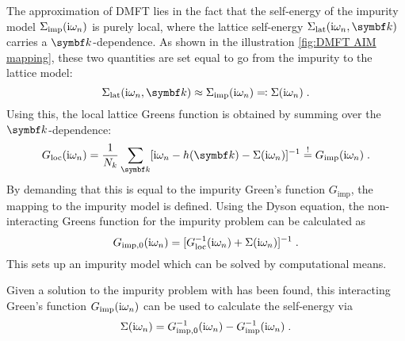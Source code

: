 \documentclass[../notes.tex]{subfiles}
\begin{document}
The approximation of DMFT lies in the fact that the self-energy of the impurity model \(\Sigma_{\mathrm{imp}} (\mathrm{i} \omega_n)\) is purely local, where the lattice self-energy \(\Sigma_{\mathrm{lat}} (\iu \omega_n, \vb{k})\) carries a \(\vb{k}\)-dependence.
As shown in the illustration \cref{fig:DMFT AIM mapping}, these two quantities are set equal to go from the impurity to the lattice model:
\begin{equation}
	\Sigma_{\mathrm{lat}} (\iu \omega_n, \vb{k}) \approx \Sigma_{\mathrm{imp}} (\iu \omega_n) \eqcolon \Sigma (\iu \omega_n) \;.
\end{equation}
Using this, the local lattice Greens function is obtained by summing over the \(\vb{k}\)-dependence:
\begin{equation}
	G_{\mathrm{loc}} (\iu \omega_n) = \frac{1}{N_k} \sum_{\vb{k}} [\iu \omega_n - h(\vb{k}) - \Sigma (\iu \omega_n)]^{-1} \overset{!}{=} G_{\mathrm{imp}} (\iu \omega_n) \;.
	\label{eq:local_lattice_Greens_function}
\end{equation}
By demanding that this is equal to the impurity Green's function \(G_{\mathrm{imp}}\), the mapping to the impurity model is defined.
Using the Dyson equation, the non-interacting Greens function for the impurity problem can be calculated as
\begin{equation}
	G_{\mathrm{imp}, 0} (\mathrm{i} \omega_n) = [G_{\mathrm{loc}}^{-1} (\mathrm{i} \omega_n) + \Sigma (\mathrm{i} \omega_n)]^{-1} \;.
	\label{eq:non-interacting_impurity_Greens_function}
\end{equation}
This sets up an impurity model which can be solved by computational means.

Given a solution to the impurity problem with has been found, this interacting Green's function \(G_{\mathrm{imp}} (\mathrm{i} \omega_n)\) can be used to calculate the self-energy via
\begin{equation}
	\Sigma (\mathrm{i} \omega_n) = G_{\mathrm{imp},0}^{-1} (\mathrm{i} \omega_n) - G_{\mathrm{imp}}^{-1} (\mathrm{i} \omega_n) \;.
	\label{eq:DMFT_loop_get_self-energy}
\end{equation}
\end{document}
